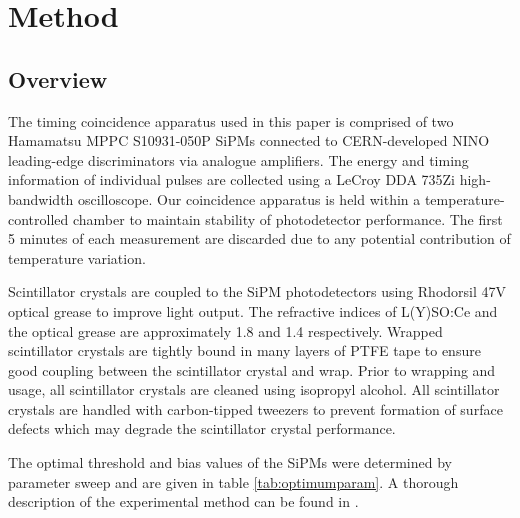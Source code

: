 \section{Method}
\label{sec:method}
\subsection{Overview}
The timing coincidence apparatus used in this paper is comprised of two Hamamatsu MPPC S10931-050P SiPMs connected to CERN-developed NINO leading-edge discriminators via analogue amplifiers. The energy and timing information of individual pulses are collected using a LeCroy DDA 735Zi high-bandwidth oscilloscope. Our coincidence apparatus is held within a temperature-controlled chamber to maintain stability of photodetector performance. The first 5 minutes of each measurement are discarded due to any potential contribution of temperature variation.

Scintillator crystals are coupled to the SiPM photodetectors using Rhodorsil 47V optical grease to improve light output. The refractive indices of L(Y)SO:Ce and the optical grease are approximately 1.8 \cite{Erdei2012} and 1.4 \cite{rhodorsilgrease} respectively. Wrapped scintillator crystals are tightly bound in many layers of PTFE tape to ensure good coupling between the scintillator crystal and wrap. Prior to wrapping and usage, all scintillator crystals are cleaned using isopropyl alcohol. All scintillator crystals are handled with carbon-tipped tweezers to prevent formation of surface defects which may degrade the scintillator crystal performance. 

The optimal threshold and bias values of the SiPMs were determined by parameter sweep and are given in table \ref{tab:optimumparam}. A thorough description of the experimental method can be found in \cite{ch_Meyer_Pizzichemi_Lecoq_2013}.
